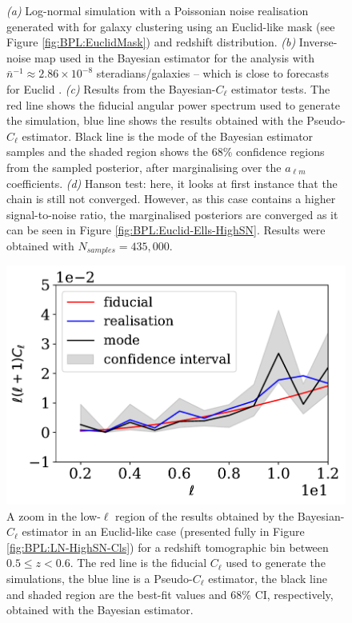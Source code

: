 \begin{figure}
\caption[Bayesian-$C_{\ell}$ estimator tested on a Euclid-like \flask log-normal simulation with signal-to-noise similar to Euclid's.]{\textit{(a)} Log-normal simulation with a Poissonian noise realisation generated with \flask for galaxy clustering using an Euclid-like mask (see Figure \ref{fig:BPL:EuclidMask}) and redshift distribution. \textit{(b)} Inverse-noise map used in the Bayesian estimator for the analysis with $\bar{n}^{-1}\approx 2.86\times 10^{-8}$ steradians/galaxies -- which is close to forecasts for Euclid \citep{2011EuclidRedPaper,2017EuclidLSST}. \textit{(c)} Results from the Bayesian-$C_{\ell}$ estimator tests. The red line shows the fiducial angular power spectrum used to generate the simulation, blue line shows the results obtained with the Pseudo-$C_{\ell}$ estimator. Black line is the mode of the Bayesian estimator samples and the shaded region shows the 68\% confidence regions from the sampled posterior, after marginalising over the $a_{\ell m}$ coefficients. \textit{(d)} Hanson test: here, it looks at first instance that the chain is still not converged. However, as this case contains a higher signal-to-noise ratio, the marginalised posteriors are converged as it can be seen in Figure \ref{fig:BPL:Euclid-Ells-HighSN}. Results were obtained with $N_{samples} = 435,000$.}
\label{fig:BPL:LogNormalFSAnalysisHighSN}
\end{figure}

\begin{figure}
\begin{center}
\includegraphics[scale=0.60]{BPL-FIGS/Euclid-LN-PNoi-N32-HDens_HPDCls-lowEll.pdf}
\caption[A zoom in the low-$\ell$ region of the results obtained by the Bayesian-$C_{\ell}$ estimator in an Euclid-like case for a redshift tomographic bin between $0.5 \leq z < 0.6$.]{A zoom in the low-$\ell$ region of the results obtained by the Bayesian-$C_{\ell}$ estimator in an Euclid-like case (presented fully in Figure \ref{fig:BPL:LN-HighSN-Cls}) for a redshift tomographic bin between $0.5 \leq z < 0.6$. The red line is the fiducial $C_{\ell}$ used to generate the simulations, the blue line is a Pseudo-$C_{\ell}$ estimator, the black line and shaded region are the best-fit values and 68\% CI, respectively, obtained with the Bayesian estimator.}
\label{fig:BPL:LN-HighSN-LowEll}
\end{center}
\end{figure}

